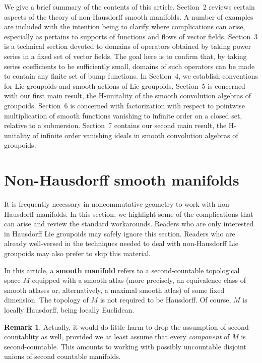 \documentclass[12pt]{article}
\theoremstyle{plain}
\theoremstyle{definition}
\newtheorem{rmk}[thm]{Remark}
\numberwithin{equation}{section}
\begin{document}
We give a brief summary of the contents of this article. Section~2 reviews  certain aspects of the theory of non-Hausdorff smooth manifolds. A number of examples are included with the intention being to clarify where complications can arise, especially as pertains to supports of functions and flows of vector fields. Section~3 is a technical section devoted to domains of operators obtained by taking power series in a fixed set of  vector fields. The goal here is to confirm that, by taking series coefficients to be sufficiently small,  domains of such operators can be made to contain any finite set of bump functions. In Section~4, we establish conventions for Lie groupoids and smooth actions of Lie groupoids. Section~5 is concerned with our first main result, the H-unitality of the smooth convolution algebras of groupoids. Section~6 is concerned with factorization  with respect to pointwise multiplication  of smooth functions vanishing to infinite order on a closed set, relative to a submersion. Section~7 contains our second main result, the H-unitality of infinite order vanishing ideals in smooth convolution algebras of groupoids.






\section{Non-Hausdorff smooth manifolds}

It is frequently necessary  in noncommutative geometry to work with non-Hausdorff manifolds. In this section, we highlight some of the complications that can arise and review the standard workarounds. Readers who are only interested in  Hausdorff Lie groupoids may safely ignore this section. Readers who are already  well-versed in the techniques needed to deal with non-Hausdorff Lie groupoids may also prefer to skip this material.

In this article, a \textbf{smooth manifold} refers to a second-countable topological space $M$ equipped with a  smooth atlas (more precisely, an equivalence class of smooth atlases or, alternatively, a maximal smooth atlas) of some fixed dimension.  The topology of $M$ is not required to be Hausdorff. Of course, $M$ is locally Hausdorff, being locally Euclidean.

\begin{rmk}Actually, it would do  little harm to drop the assumption of second-countablity as well, provided we at least assume that every \emph{component} of $M$ is second-countable. This amounts to working with possibly uncountable disjoint unions of second countable manifolds.
\end{rmk}
\end{document}
